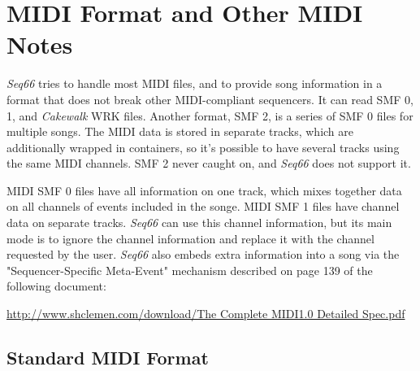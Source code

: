 %
%
%

\section{MIDI Format and Other MIDI Notes}
\label{sec:midi_format_and_midi_notes}

   \textsl{Seq66} tries to handle most MIDI files, and to provide
   song information in a format that does not break other MIDI-compliant
   sequencers.  It can read SMF 0, 1, and \textsl{Cakewalk} WRK files.
   Another format, SMF 2, is a series of SMF 0 files for multiple songs.
   The MIDI data is
   stored in separate tracks, which are additionally wrapped in containers, so
   it's possible to have several tracks using the same MIDI channels. SMF 2
   never caught on, and \textsl{Seq66} does not support it.

   MIDI SMF 0 files have all information on one track, which mixes together
   data on all channels of events included in the songe.
   MIDI SMF 1 files have channel data on separate tracks.
   \textsl{Seq66} can use this channel information, but its main mode is to
   ignore the channel information and replace it with the channel requested by
   the user.
   \textsl{Seq66} also embeds extra information into a song via the
   "Sequencer-Specific Meta-Event" mechanism described on page 139 of the
   following document:

   \url{http://www.shclemen.com/download/The Complete MIDI1.0 Detailed Spec.pdf}


\subsection{Standard MIDI Format}
\label{subsec:midi_format_smf}

